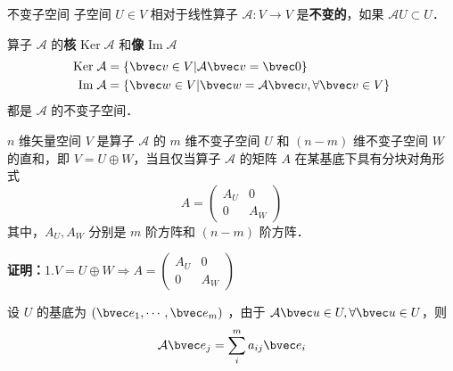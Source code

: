 
\begin{issues}
\issueTODO
\end{issues}

\begin{definition}{不变子空间}
子空间 $U\in V$ 相对于线性算子 $\mathcal{A}:V\rightarrow V$ 是\textbf{不变的}，如果 $\mathcal{A}U\subset U$．
\end{definition}
\begin{example}{}
算子 $\mathcal{A}$ 的\textbf{核} $\mathrm{Ker}\;\mathcal A$ 和\textbf{像} $\mathrm{Im}\;\mathcal{A}$
\begin{equation}
\begin{aligned}
\mathrm{Ker}\;\mathcal{A}&=\{\bvec v\in V|\mathcal{A}\bvec v=\bvec 0\}\\
\mathrm{Im}\;\mathcal{A}&=\{\bvec w\in V|\bvec w=\mathcal{A}\bvec v,\forall\bvec v\in V\}
\end{aligned}
\end{equation}
都是 $\mathcal A$ 的不变子空间．
\end{example}
\begin{theorem}{}
$n$ 维矢量空间 $V$ 是算子 $\mathcal{A}$ 的 $m$ 维不变子空间 $U$ 和 $(n-m)$ 维不变子空间 $W$ 的直和，即 $V=U\oplus W$，当且仅当算子 $\mathcal{A}$ 的矩阵 $A$ 在某基底下具有分块对角形式
\begin{equation}
A=\begin{pmatrix}
A_U&0\\
0&A_W
\end{pmatrix}
\end{equation}
其中，$A_U,A_W$ 分别是 $m$ 阶方阵和 $(n-m)$ 阶方阵．
\end{theorem}
\textbf{证明：}1.$
V=U\oplus W\Rightarrow A=\begin{pmatrix}
A_U&0\\
0&A_W
\end{pmatrix}
$

设 $U$ 的基底为 $(\bvec e_1,\cdots,\bvec e_m)$ ，由于 $\mathcal{A}\bvec u\in U, \forall \bvec u\in U$，则
\begin{equation}
\mathcal{A}\bvec e_j=\sum_{i}^m a_{ij}\bvec e_i
\end{equation}
